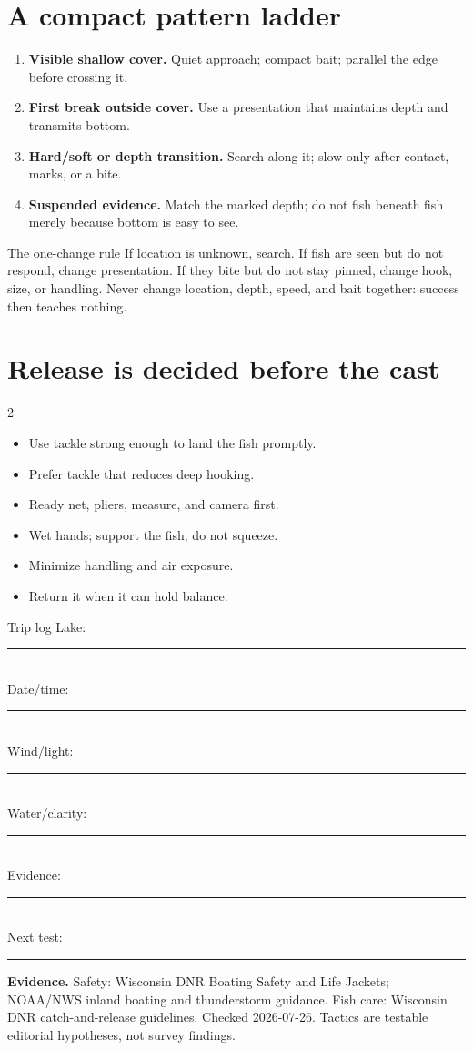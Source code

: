 \section{A compact pattern ladder}
\begin{enumerate}
\item \textbf{Visible shallow cover.} Quiet approach; compact bait; parallel
the edge before crossing it.
\item \textbf{First break outside cover.} Use a presentation that maintains
depth and transmits bottom.
\item \textbf{Hard/soft or depth transition.} Search along it; slow only after
contact, marks, or a bite.
\item \textbf{Suspended evidence.} Match the marked depth; do not fish beneath
fish merely because bottom is easy to see.
\end{enumerate}

\begin{telospanel}{The one-change rule}
If location is unknown, search. If fish are seen but do not respond, change
presentation. If they bite but do not stay pinned, change hook, size, or
handling. Never change location, depth, speed, and bait together: success then
teaches nothing.
\end{telospanel}

\section{Release is decided before the cast}
\begin{multicols}{2}
\begin{itemize}
\item Use tackle strong enough to land the fish promptly.
\item Prefer tackle that reduces deep hooking.
\item Ready net, pliers, measure, and camera first.
\item Wet hands; support the fish; do not squeeze.
\item Minimize handling and air exposure.
\item Return it when it can hold balance.
\end{itemize}
\columnbreak
\begin{teloscard}{Trip log}
Lake:\ \rule{0.68\linewidth}{0.4pt}\\
Date/time:\ \rule{0.57\linewidth}{0.4pt}\\
Wind/light:\ \rule{0.54\linewidth}{0.4pt}\\
Water/clarity:\ \rule{0.48\linewidth}{0.4pt}\\
Evidence:\ \rule{0.63\linewidth}{0.4pt}\\[.5em]
Next test:\ \rule{0.61\linewidth}{0.4pt}
\end{teloscard}
\end{multicols}

{\footnotesize\textbf{Evidence.} Safety: Wisconsin DNR Boating Safety and Life
Jackets; NOAA/NWS inland boating and thunderstorm guidance. Fish care:
Wisconsin DNR catch-and-release guidelines. Checked 2026-07-26. Tactics are
testable editorial hypotheses, not survey findings.}

